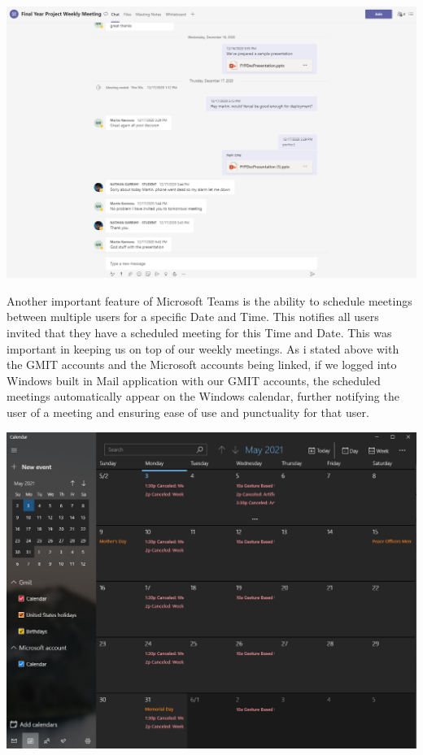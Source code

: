 \includegraphics[scale=0.4]{img/teams.PNG}\par
Another important feature of Microsoft Teams is the ability to schedule meetings between multiple users for a specific Date and Time. This notifies all users invited that they have a scheduled meeting for this Time and Date. This was important in keeping us on top of our weekly meetings. As i stated above with the GMIT accounts and the Microsoft accounts being linked, if we logged into Windows built in Mail application with our GMIT accounts, the scheduled meetings automatically appear on the Windows calendar, further notifying the user of a meeting and ensuring ease of use and punctuality for that user.\par
\includegraphics[scale=0.4]{img/Caledar.PNG} \par
